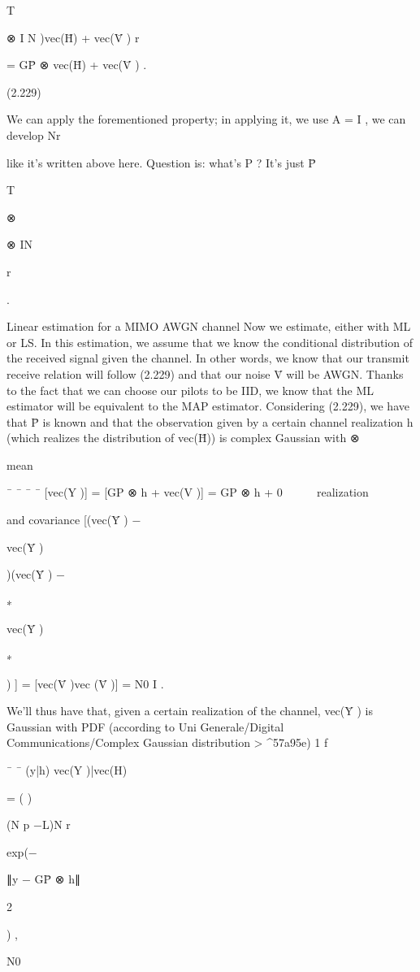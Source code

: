{{{T

⊗ I N )vec(H̄) + vec(V̄ )
r

= \sqrt GP̄ ⊗ vec(H̄) + vec(V̄ ) .

(2.229)

We can apply the forementioned property; in applying it, we use A = I , we can develop Nr

like it's written above here.
Question is: what's P ? It's just P̄

T

⊗

⊗ IN

r

.

Linear estimation for a MIMO AWGN channel Now we estimate, either with ML or LS.
In this estimation, we assume that we know the conditional distribution of the received signal given the channel. In other words, we know that our transmit receive relation will follow (2.229) and that our noise V̄ will be AWGN.
Thanks to the fact that we can choose our pilots to be IID, we know that the ML estimator will be equivalent to the MAP estimator.
Considering (2.229), we have that P̄ is known and that the observation given by a certain channel realization h (which realizes the distribution of vec(H̄)) is complex Gaussian with
⊗

mean

¯
¯
¯
¯
[vec(Y )] = [\sqrt GP ⊗
h
+ vec(V )] = \sqrt GP ⊗ h + 0



realization

and covariance [(vec(Ȳ ) − \mu

vec(Ȳ )

)(vec(Ȳ ) − \mu

∗

vec(Ȳ )

∗

) ] = [vec(V̄ )vec (V̄ )]
= N0 I .

We'll thus have that, given a certain realization of the channel, vec(Ȳ ) is Gaussian with PDF (according to Uni Generale/Digital Communications/Complex Gaussian distribution >
^57a95e)
1 f

¯
¯ (y|h)
vec(Y )|vec(H)

=
( )

(N p −L)N r

exp(−

∥y − \sqrt GP̄ ⊗ h∥

2

) ,

N0

}}}
